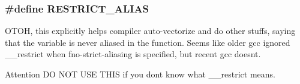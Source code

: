 \subsubsection[{\texorpdfstring{R\+E\+S\+T\+R\+I\+C\+T\+\_\+\+A\+L\+I\+AS}{RESTRICT_ALIAS}}]{\setlength{\rightskip}{0pt plus 5cm}\#define R\+E\+S\+T\+R\+I\+C\+T\+\_\+\+A\+L\+I\+AS}\hypertarget{group__COMPILER_ga6decd303d90f9cd75d6bb79d51ea2154}{}\label{group__COMPILER_ga6decd303d90f9cd75d6bb79d51ea2154}
O\+T\+OH, this explicitly helps compiler auto-\/vectorize and do other stuffs, saying that the variable is never aliased in the function. Seems like older gcc ignored \+\_\+\+\_\+restrict when fno-\/strict-\/aliasing is specified, but recent gcc doesn\textquotesingle{}t. \begin{DoxyAttention}{Attention}
DO N\+OT U\+SE T\+H\+IS if you don\textquotesingle{}t know what \+\_\+\+\_\+restrict means. 
\end{DoxyAttention}
